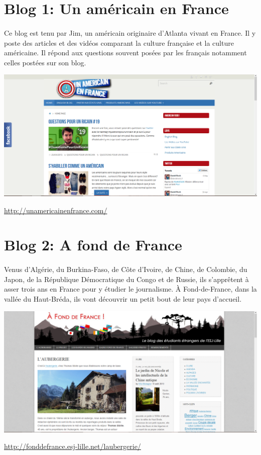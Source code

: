 \section{Blog 1: Un américain en France}

\paragraph{} Ce blog est tenu par Jim, un américain originaire d'Atlanta vivant
en France. Il y poste des articles et des vidéos comparant la culture française
et la culture américaine. Il répond aux questions souvent posées par les
français notamment celles postées sur son blog.

\begin{center}
	\includegraphics[scale=0.25]{Americain.png}
\end{center}
\url{http://unamericainenfrance.com/}

\section{Blog 2: A fond de France}

\paragraph{} Venus d’Algérie, du Burkina-Faso, de Côte d’Ivoire, de Chine, de
Colombie, du Japon, de la République Démocratique du Congo et de Russie, ils
s’apprêtent à asser trois ans en France pour y étudier le journalisme. À
Fond-de-France, dans la vallée du Haut-Bréda, ils vont découvrir un petit bout
de leur pays d’accueil.

\begin{center}
	\includegraphics[scale=0.25]{AFondDeFrance.png}
\end{center}
\url{http://fonddefrance.esj-lille.net/laubergerie/}

